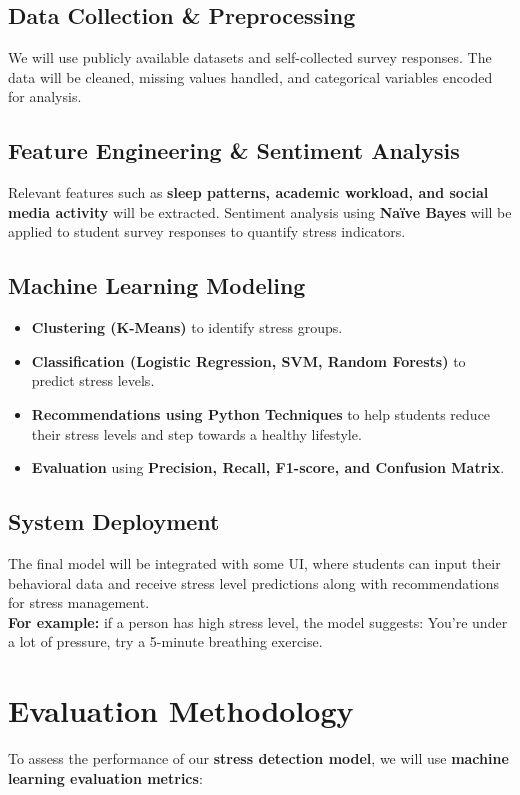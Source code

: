 \documentclass[a4paper,11pt]{article}
\begin{document}
\subsection{Data Collection \& Preprocessing}
We will use publicly available datasets and self-collected survey responses. The data will be cleaned, missing values handled, and categorical variables encoded for analysis.

\subsection{Feature Engineering \& Sentiment Analysis}
Relevant features such as \textbf{sleep patterns, academic workload, and social media activity} will be extracted. Sentiment analysis using \textbf{Naïve Bayes} will be applied to student survey responses to quantify stress indicators.

\subsection{Machine Learning Modeling}
\begin{itemize}
    \item \textbf{Clustering (K-Means)} to identify stress groups.
    \item \textbf{Classification (Logistic Regression, SVM, Random Forests)} to predict stress levels.
    \item \textbf{Recommendations using Python Techniques} to help students reduce their stress levels and step towards a healthy lifestyle.
    \item \textbf{Evaluation} using \textbf{Precision, Recall, F1-score, and Confusion Matrix}.
\end{itemize}

\subsection{System Deployment}
The final model will be integrated with some UI, where students can input their behavioral data and receive stress level predictions along with recommendations for stress management.\\
\textbf{For example:} if a person has high stress level, the model suggests: You’re under a lot of pressure, try a 5-minute breathing exercise.

\section{Evaluation Methodology}
To assess the performance of our \textbf{stress detection model}, we will use \textbf{machine learning evaluation metrics}:
\end{document}
